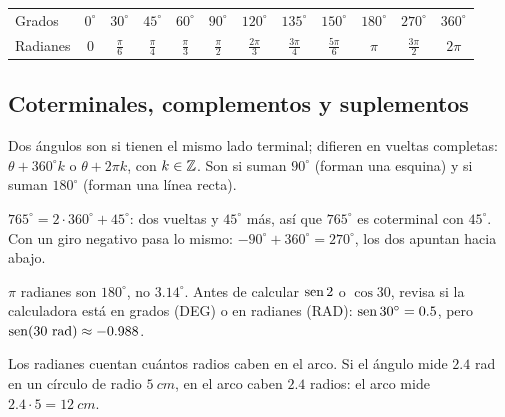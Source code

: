 \documentclass[11pt,a4paper]{article}
\let\nivelorig\nivel
\renewcommand{\nivel}[2]{\Needspace{8\baselineskip}\nivelorig{#1}{#2}}
\begin{document}
\begin{center}\small
\begin{tabular}{@{}l*{11}{c}@{}}
\toprule
Grados & $0^\circ$ & $30^\circ$ & $45^\circ$ & $60^\circ$ & $90^\circ$ & $120^\circ$ & $135^\circ$ & $150^\circ$ & $180^\circ$ & $270^\circ$ & $360^\circ$\\
Radianes & $0$ & $\frac{\pi}{6}$ & $\frac{\pi}{4}$ & $\frac{\pi}{3}$ & $\frac{\pi}{2}$ & $\frac{2\pi}{3}$ & $\frac{3\pi}{4}$ & $\frac{5\pi}{6}$ & $\pi$ & $\frac{3\pi}{2}$ & $2\pi$\\
\bottomrule
\end{tabular}
\end{center}

\subsection{Coterminales, complementos y suplementos}
\begin{definicion}
Dos ángulos son  si tienen el mismo lado terminal; difieren en vueltas completas:
$\theta+360^\circ k$ o $\theta+2\pi k$, con $k\in\mathbb{Z}$. Son  si suman $90^\circ$ (forman una
esquina) y  si suman $180^\circ$ (forman una línea recta).
\end{definicion}
\begin{ejemplo}
$765^\circ=2\cdot360^\circ+45^\circ$: dos vueltas y $45^\circ$ más, así que $765^\circ$ es coterminal con $45^\circ$.
Con un giro negativo pasa lo mismo: $-90^\circ+360^\circ=270^\circ$, los dos apuntan hacia abajo.
\end{ejemplo}

\begin{ojo}
$\pi$ radianes son $180^\circ$, no $3.14^\circ$. Antes de calcular $\operatorname{sen} 2$ o $\cos 30$, revisa si la calculadora está en
grados (DEG) o en radianes (RAD): $\operatorname{sen} 30^\circ=0.5$, pero $\operatorname{sen}(30\ \text{rad})\approx-0.988$.
\end{ojo}


Los radianes cuentan cuántos radios caben en el arco. Si el ángulo mide $2.4$ rad en un círculo de radio
$\SI{5}{cm}$, en el arco caben $2.4$ radios: el arco mide $2.4\cdot5=\SI{12}{cm}$.
\end{document}
